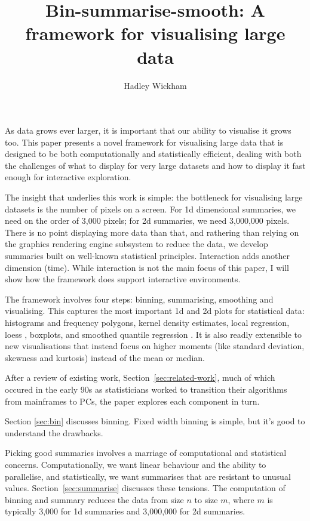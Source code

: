 \documentclass[journal]{vgtc}                %
\title{Bin-summarise-smooth: A framework for visualising large data}
\author{Hadley Wickham}
\begin{document}

\maketitle

As data grows ever larger, it is important that our ability to visualise it grows too. This paper presents a novel framework for visualising large data that is designed to be both computationally and statistically efficient, dealing with both the challenges of what to display for very large datasets and how to display it fast enough for interactive exploration.

The insight that underlies this work is simple: the bottleneck for visualising large datasets is the number of pixels on a screen. For 1d dimensional summaries, we need on the order of 3,000 pixels; for 2d summaries, we need 3,000,000 pixels. There is no point displaying more data than that, and rathering than relying on the graphics rendering engine subsystem to reduce the data, we develop summaries built on well-known statistical principles. Interaction adds another dimension (time). While interaction is not the main focus of this paper, I will show how the framework does support interactive environments.

The framework involves four steps: binning, summarising, smoothing and visualising. This captures the most important 1d and 2d plots for statistical data: histograms and frequency polygons, kernel density estimates, local regression, loess \citep{cleveland:1979}, boxplots, and smoothed quantile regression \citep{koenker:2005}. It is also readly extensible to new visualisations that instead focus on higher moments (like standard deviation, skewness and kurtosis) instead of the mean or median.

After a review of existing work, Section~\ref{sec:related-work}, much of which occured in the early 90s as statisticians worked to transition their algorithms from mainframes to PCs, the paper explores each component in turn.


Section \ref{sec:bin} discusses binning. Fixed width binning is simple, but it's good to understand the drawbacks.

Picking good summaries involves a marriage of computational and statistical  concerns. Computationally, we want linear behaviour and the ability to parallelise, and statistically, we want summarises that are resistant to unusual values. Section~\ref{sec:summarise} discusses these tensions. The computation of binning and summary reduces the data from size $n$ to size $m$, where $m$ is typically 3,000 for 1d summaries and 3,000,000 for 2d summaries.
\end{document}
